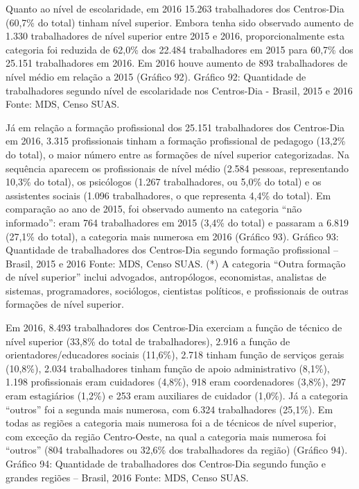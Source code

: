 \documentclass[
  brazilian]{report}
\begin{document}
Quanto ao nível de escolaridade, em 2016 15.263 trabalhadores dos
Centros-Dia (60,7\% do total) tinham nível superior. Embora tenha sido
observado aumento de 1.330 trabalhadores de nível superior entre 2015 e
2016, proporcionalmente esta categoria foi reduzida de 62,0\% dos 22.484
trabalhadores em 2015 para 60,7\% dos 25.151 trabalhadores em 2016. Em
2016 houve aumento de 893 trabalhadores de nível médio em relação a 2015
(Gráfico 92). Gráfico 92: Quantidade de trabalhadores segundo nível de
escolaridade nos Centros-Dia - Brasil, 2015 e 2016 Fonte: MDS, Censo
SUAS.

Já em relação a formação profissional dos 25.151 trabalhadores dos
Centros-Dia em 2016, 3.315 profissionais tinham a formação profissional
de pedagogo (13,2\% do total), o maior número entre as formações de
nível superior categorizadas. Na sequência aparecem os profissionais de
nível médio (2.584 pessoas, representando 10,3\% do total), os
psicólogos (1.267 trabalhadores, ou 5,0\% do total) e os assistentes
sociais (1.096 trabalhadores, o que representa 4,4\% do total). Em
comparação ao ano de 2015, foi observado aumento na categoria ``não
informado'': eram 764 trabalhadores em 2015 (3,4\% do total) e passaram
a 6.819 (27,1\% do total), a categoria mais numerosa em 2016 (Gráfico
93). Gráfico 93: Quantidade de trabalhadores dos Centros-Dia segundo
formação profissional -- Brasil, 2015 e 2016 Fonte: MDS, Censo SUAS. (*)
A categoria ``Outra formação de nível superior'' inclui advogados,
antropólogos, economistas, analistas de sistemas, programadores,
sociólogos, cientistas políticos, e profissionais de outras formações de
nível superior.

Em 2016, 8.493 trabalhadores dos Centros-Dia exerciam a função de
técnico de nível superior (33,8\% do total de trabalhadores), 2.916 a
função de orientadores/educadores sociais (11,6\%), 2.718 tinham função
de serviços gerais (10,8\%), 2.034 trabalhadores tinham função de apoio
administrativo (8,1\%), 1.198 profissionais eram cuidadores (4,8\%), 918
eram coordenadores (3,8\%), 297 eram estagiários (1,2\%) e 253 eram
auxiliares de cuidador (1,0\%). Já a categoria ``outros'' foi a segunda
mais numerosa, com 6.324 trabalhadores (25,1\%). Em todas as regiões a
categoria mais numerosa foi a de técnicos de nível superior, com exceção
da região Centro-Oeste, na qual a categoria mais numerosa foi ``outros''
(804 trabalhadores ou 32,6\% dos trabalhadores da região) (Gráfico 94).
Gráfico 94: Quantidade de trabalhadores dos Centros-Dia segundo função e
grandes regiões -- Brasil, 2016 Fonte: MDS, Censo SUAS.
\end{document}
